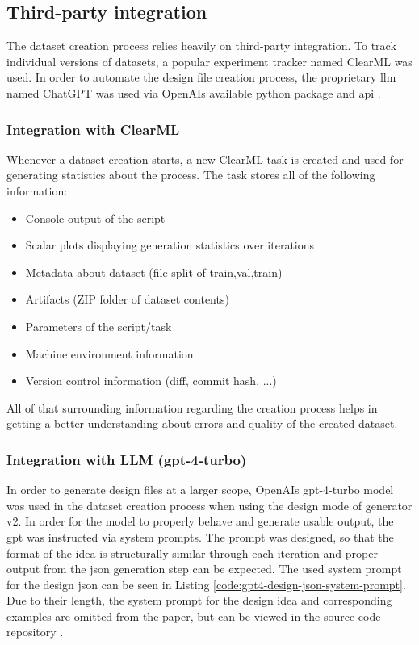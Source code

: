 \documentclass[Bachelor, BIC, english, fhCitStyle, IEEE]{BASE/twbook} %
\newcommand{\nocontentsline}[3]{}
\newcommand{\hidsubsubsection}[1]{\bgroup\let\addcontentsline=\nocontentsline\subsubsection{#1}\egroup}
\begin{document}
\subsection{Third-party integration} %
The dataset creation process relies heavily on third-party integration. To track individual versions of datasets, a popular experiment tracker named ClearML was used. In order to automate the design file creation process, the proprietary \ac{llm} named ChatGPT was used via OpenAIs available python package and \ac{api} \autocite{OpenaiOpenaipython2024}.
\hidsubsubsection{Integration with ClearML}
\noindent
Whenever a dataset creation starts, a new ClearML task is created and used for generating statistics about the process. The task stores all of the following information:
\begin{itemize}
    \item Console output of the script
    \item Scalar plots displaying generation statistics over iterations
    \item Metadata about dataset (file split of train,val,train)
    \item Artifacts (ZIP folder of dataset contents)
    \item Parameters of the script/task
    \item Machine environment information
    \item Version control information (diff, commit hash, ...)
\end{itemize}
All of that surrounding information regarding the creation process helps in getting a better understanding about errors and quality of the created dataset.
\hidsubsubsection{Integration with LLM (gpt-4-turbo)}
\noindent
In order to generate design files at a larger scope, OpenAIs gpt-4-turbo model was used in the dataset creation process when using the design mode of generator v2. In order for the model to properly behave and generate usable output, the \ac{gpt} was instructed via system prompts.
The prompt was designed, so that the format of the idea is structurally similar through each iteration and proper output from the \ac{json} generation step can be expected. The used system prompt for the design \ac{json} can be seen in Listing \ref{code:gpt4-design-json-system-prompt}. Due to their length, the system prompt for the design idea and corresponding examples are omitted from the paper, but can be viewed in the source code repository \autocite{UidetectorSrcGenerate}.
\end{document}
